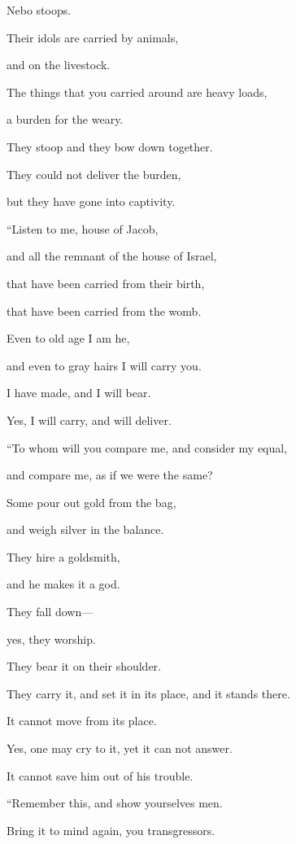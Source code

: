 \quad\quad Nebo stoops.

Their idols are carried by animals,

and on the livestock.

The things that you carried around are heavy loads,

a burden for the weary.

\myverse{}They stoop and they bow down together.

They could not deliver the burden,

but they have gone into captivity.


\vspace{\baselineskip} \myverse{}“Listen to me, house of Jacob,

and all the remnant of the house of Israel,

that have been carried from their birth,

that have been carried from the womb.

\myverse{}Even to old age I am he,

and even to gray hairs I will carry you.

I have made, and I will bear.

Yes, I will carry, and will deliver.


\vspace{\baselineskip} \myverse{}“To whom will you compare me, and consider my equal,

and compare me, as if we were the same?

\myverse{}Some pour out gold from the bag,

and weigh silver in the balance.

They hire a goldsmith,

and he makes it a god.

They fall down—

yes, they worship.

\myverse{}They bear it on their shoulder.

They carry it, and set it in its place, and it stands there.

It cannot move from its place.

Yes, one may cry to it, yet it can not answer.

It cannot save him out of his trouble.


\vspace{\baselineskip} \myverse{}“Remember this, and show yourselves men.

Bring it to mind again, you transgressors.

